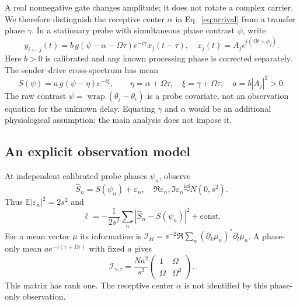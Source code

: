 \documentclass[submission,nolinenumbers]{esj}
\newcommand{\wrap}{\operatorname{wrap}}
\begin{document}
A real nonnegative gate changes amplitude; it does not rotate a complex carrier. We therefore distinguish the receptive center $\alpha$ in Eq.~\eqref{eq:arrival} from a transfer phase $\gamma$. In a stationary probe with simultaneous phase contrast $\psi$, write
\begin{equation}
y_{i\leftarrow j}(t)=b\,g(\psi-\alpha-\Omega\tau)e^{-i\gamma}x_j(t-\tau),\quad
x_j(t)=A_j e^{i(\Omega t+\phi_j)}.\label{eq:obs}
\end{equation}
Here $b>0$ is calibrated and any known processing phase is corrected separately. The sender--drive cross-spectrum has mean
\begin{equation}
S(\psi)=a\,g(\psi-\eta)e^{-i\xi},\qquad
\eta=\alpha+\Omega\tau,\quad\xi=\gamma+\Omega\tau,\quad a=b|A_j|^2>0.\label{eq:obsphase}
\end{equation}
The raw contrast $\psi=\wrap(\theta_j-\theta_i)$ is a probe covariate, not an observation equation for the unknown delay. Equating $\gamma$ and $\alpha$ would be an additional physiological assumption; the main analysis does not impose it.

\subsection{An explicit observation model}\label{sec:obsmodel}
At independent calibrated probe phases $\psi_n$, observe
\begin{equation}
\widehat S_n=S(\psi_n)+\varepsilon_n,\quad
\Re\varepsilon_n,\Im\varepsilon_n\stackrel{\mathrm{iid}}{\sim}N(0,s^2).
\label{eq:noisyS}
\end{equation}
Thus $\mathbb E|\varepsilon_n|^2=2s^2$ and
\begin{equation}
\ell=-\frac{1}{2s^2}\sum_n|\widehat S_n-S(\psi_n)|^2+\mathrm{const}.
\label{eq:loglik}
\end{equation}
For a mean vector $\mu$ its information is $\mathcal I_{kl}=s^{-2}\Re\sum_n(\partial_k\mu_n)^*\partial_l\mu_n$. A phase-only mean $a e^{-i(\gamma+\Omega\tau)}$ with fixed $a$ gives
\begin{equation}
\mathcal I_{\gamma,\tau}=\frac{Na^2}{s^2}
\begin{pmatrix}1&\Omega\\\Omega&\Omega^2\end{pmatrix}.\label{eq:Fisher}
\end{equation}
This matrix has rank one. The receptive center $\alpha$ is not identified by this phase-only observation.
\end{document}
